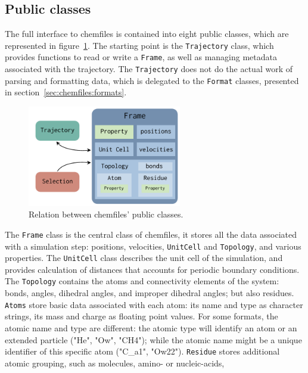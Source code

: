 \documentclass[thesis]{subfiles}
\begin{document}
\subsection{Public classes}

The full interface to chemfiles is contained into eight public classes, which
are represented in figure~\ref{fig:chemfiles:classes}. The starting point is the
\texttt{Trajectory} class, which provides functions to read or write a
\texttt{Frame}, as well as managing metadata associated with the trajectory. The
\texttt{Trajectory} does not do the actual work of parsing and formatting data,
which is delegated to the \texttt{Format} classes, presented in
section~\ref{sec:chemfiles:formats}.

\begin{figure}[ht]
    \centering
    \includegraphics[width=0.6\textwidth]{figures/images/chemfiles-classes}
    \caption{Relation between chemfiles' public classes.}
    \label{fig:chemfiles:classes}
\end{figure}

The \texttt{Frame} class is the central class of chemfiles, it stores all the
data associated with a simulation step: positions, velocities, \texttt{UnitCell}
and \texttt{Topology}, and various properties. The \texttt{UnitCell} class
describes the unit cell of the simulation, and provides calculation of distances
that accounts for periodic boundary conditions. The \texttt{Topology} contains
the atoms and connectivity elements of the system: bonds, angles, dihedral
angles, and improper dihedral angles; but also residues. \texttt{Atoms} store
basic data associated with each atom: its name and type as character strings,
its mass and charge as floating point values. For some formats, the atomic name
and type are different: the atomic type will identify an atom or an extended
particle ("He", "Ow", "CH4"); while the atomic name might be a unique
identifier of this specific atom ("C\_a1", "Ow22"). \texttt{Residue} stores
additional atomic grouping, such as molecules, amino- or nucleic-acids, \etc
\end{document}
